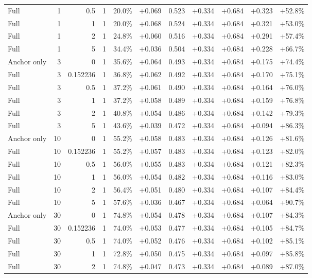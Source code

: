 \begin{table}[htbp]
\begin{tabular}{lrrrccccccc}
Full & 1 & 0.5 & 1 & 20.0\% & +0.069 & 0.523 & +0.334 & +0.684 & +0.323 & +52.8\% \\
Full & 1 & 1 & 1 & 20.0\% & +0.068 & 0.524 & +0.334 & +0.684 & +0.321 & +53.0\% \\
Full & 1 & 2 & 1 & 24.8\% & +0.060 & 0.516 & +0.334 & +0.684 & +0.291 & +57.4\% \\
Full & 1 & 5 & 1 & 34.4\% & +0.036 & 0.504 & +0.334 & +0.684 & +0.228 & +66.7\% \\
Anchor only & 3 & 0 & 1 & 35.6\% & +0.064 & 0.493 & +0.334 & +0.684 & +0.175 & +74.4\% \\
Full & 3 & 0.152236 & 1 & 36.8\% & +0.062 & 0.492 & +0.334 & +0.684 & +0.170 & +75.1\% \\
Full & 3 & 0.5 & 1 & 37.2\% & +0.061 & 0.490 & +0.334 & +0.684 & +0.164 & +76.0\% \\
Full & 3 & 1 & 1 & 37.2\% & +0.058 & 0.489 & +0.334 & +0.684 & +0.159 & +76.8\% \\
Full & 3 & 2 & 1 & 40.8\% & +0.054 & 0.486 & +0.334 & +0.684 & +0.142 & +79.3\% \\
Full & 3 & 5 & 1 & 43.6\% & +0.039 & 0.472 & +0.334 & +0.684 & +0.094 & +86.3\% \\
Anchor only & 10 & 0 & 1 & 55.2\% & +0.058 & 0.483 & +0.334 & +0.684 & +0.126 & +81.6\% \\
Full & 10 & 0.152236 & 1 & 55.2\% & +0.057 & 0.483 & +0.334 & +0.684 & +0.123 & +82.0\% \\
Full & 10 & 0.5 & 1 & 56.0\% & +0.055 & 0.483 & +0.334 & +0.684 & +0.121 & +82.3\% \\
Full & 10 & 1 & 1 & 56.0\% & +0.054 & 0.482 & +0.334 & +0.684 & +0.116 & +83.0\% \\
Full & 10 & 2 & 1 & 56.4\% & +0.051 & 0.480 & +0.334 & +0.684 & +0.107 & +84.4\% \\
Full & 10 & 5 & 1 & 57.6\% & +0.036 & 0.467 & +0.334 & +0.684 & +0.064 & +90.7\% \\
Anchor only & 30 & 0 & 1 & 74.8\% & +0.054 & 0.478 & +0.334 & +0.684 & +0.107 & +84.3\% \\
Full & 30 & 0.152236 & 1 & 74.0\% & +0.053 & 0.477 & +0.334 & +0.684 & +0.105 & +84.7\% \\
Full & 30 & 0.5 & 1 & 74.0\% & +0.052 & 0.476 & +0.334 & +0.684 & +0.102 & +85.1\% \\
Full & 30 & 1 & 1 & 72.8\% & +0.050 & 0.475 & +0.334 & +0.684 & +0.097 & +85.8\% \\
Full & 30 & 2 & 1 & 74.8\% & +0.047 & 0.473 & +0.334 & +0.684 & +0.089 & +87.0\% \\

\end{tabular}
\end{table}
